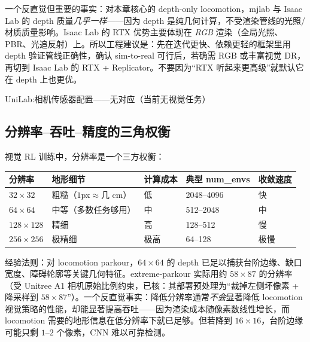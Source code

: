 \begin{insight}\label{ins:rlmc-vm-depthsame}
一个反直觉但重要的事实：对本章核心的 depth-only locomotion，mjlab 与 Isaac Lab 的 depth 质量\emph{几乎一样}——因为 depth 是纯几何计算，不受渲染管线的光照/材质质量影响。Isaac Lab 的 RTX 优势主要体现在 \emph{RGB} 渲染（全局光照、PBR、光追反射）上。所以工程建议是：先在迭代更快、依赖更轻的框架里用 depth 验证管线正确性，确认 sim-to-real 可行后，若确需 RGB 或丰富视觉 DR，再切到 Isaac Lab 的 RTX + Replicator。不要因为“RTX 听起来更高级”就默认它在 depth 上也更优。
\end{insight}

\begin{codebox}[text]{UniLab:相机传感器配置——无对应（当前无视觉任务）}
\end{codebox}

\subsection{分辨率--吞吐--精度的三角权衡}
\label{sec:rlmc-vm-resolution}

视觉 RL 训练中，分辨率是一个三方权衡：

\begin{center}
\small
\begin{tabular}{@{}lllll@{}}
\toprule
分辨率 & 地形细节 & 计算成本 & 典型 num\_envs & 收敛速度 \\
\midrule
$32\times32$ & 粗糙（$1$px$\approx$几 cm） & 低 & 2048--4096 & 快 \\
$64\times64$ & 中等（多数任务够用） & 中 & 512--2048 & 中 \\
$128\times128$ & 精细 & 高 & 128--512 & 慢 \\
$256\times256$ & 极精细 & 极高 & 64--128 & 极慢 \\
\bottomrule
\end{tabular}
\end{center}

经验法则：对 locomotion parkour，$64\times64$ 的 depth 已足以捕获台阶边缘、缺口宽度、障碍轮廓等关键几何特征。extreme-parkour 实际用约 $58\times87$ 的分辨率（受 Unitree A1 相机原始比例约束，已核：其部署预处理为“裁掉左侧坏像素 + 降采样到 $58\times87$”）。一个反直觉事实：降低分辨率通常\emph{不会}显著降低 locomotion 视觉策略的性能，却能显著提高吞吐——因为渲染成本随像素数线性增长，而 locomotion 需要的地形信息在低分辨率下就已足够。但若降到 $16\times16$，台阶边缘可能只剩 $1$--$2$ 个像素，CNN 难以可靠检测。

